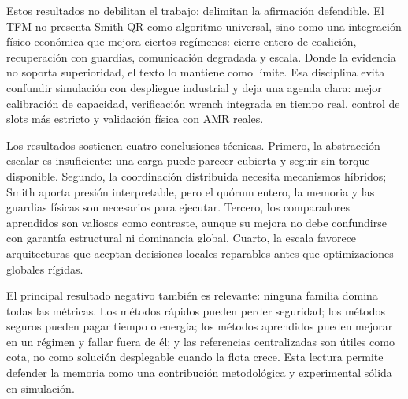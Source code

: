 Estos resultados no debilitan el trabajo; delimitan la afirmación defendible. El TFM no
presenta Smith-QR como algoritmo universal, sino como una integración físico-económica
que mejora ciertos regímenes: cierre entero de coalición, recuperación con guardias,
comunicación degradada y escala. Donde la evidencia no soporta superioridad, el texto lo
mantiene como límite. Esa disciplina evita confundir simulación con despliegue industrial
y deja una agenda clara: mejor calibración de capacidad, verificación wrench integrada en
tiempo real, control de slots más estricto y validación física con AMR reales.

Los resultados sostienen cuatro conclusiones técnicas. Primero, la abstracción escalar es
insuficiente: una carga puede parecer cubierta y seguir sin torque disponible. Segundo,
la coordinación distribuida necesita mecanismos híbridos; Smith aporta presión
interpretable, pero el quórum entero, la memoria y las guardias físicas son necesarios
para ejecutar. Tercero, los comparadores aprendidos son valiosos como contraste, aunque
su mejora no debe confundirse con garantía estructural ni dominancia global. Cuarto, la
escala favorece arquitecturas que aceptan decisiones locales reparables antes que
optimizaciones globales rígidas.

El principal resultado negativo también es relevante: ninguna familia domina todas las
métricas. Los métodos rápidos pueden perder seguridad; los métodos seguros pueden pagar
tiempo o energía; los métodos aprendidos pueden mejorar en un régimen y fallar fuera de
él; y las referencias centralizadas son útiles como cota, no como solución desplegable
cuando la flota crece. Esta lectura permite defender la memoria como una contribución
metodológica y experimental sólida en simulación.
